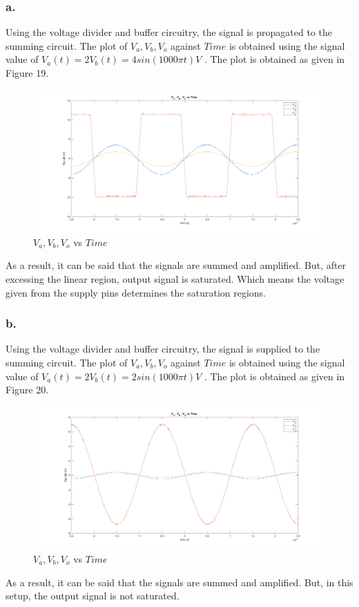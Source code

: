 \documentclass[letterpaper,12pt]{article}
\begin{document}
\subsubsection{a.}
Using the voltage divider and buffer circuitry, the signal is propagated to the summing circuit. The plot of \(V_{a} , V_{b} , V_{o} \) against \( Time\) is obtained using the signal value of \(V_{a}(t) = 2 V_{b}(t) = 4sin(1000\pi t) V\) . The plot is obtained as given in Figure 19.
\begin{figure}[H]
	\centering
   \includegraphics[width=1\textwidth]{e_3_a.png}
   \caption{\(V_{a} , V_{b} , V_{o} \) vs \( Time\)}
\end{figure} 
As a result, it can be said that the signals are summed and amplified. But, after excessing the linear region, output signal is saturated. Which means the voltage given from the supply pins determines the saturation regions.

\subsubsection{b.}
Using the voltage divider and buffer circuitry, the signal is supplied to the summing circuit. The plot of \(V_{a} , V_{b} , V_{o} \) against \( Time\) is obtained using the signal value of \(V_{a}(t) = 2 V_{b}(t) = 2sin(1000\pi t) V\) . The plot is obtained as given in Figure 20.
\begin{figure}[H]
	\centering
   \includegraphics[width=1\textwidth]{e_3_b.png}
   \caption{\(V_{a} , V_{b} , V_{o} \) vs \( Time\)}
\end{figure} 
As a result, it can be said that the signals are summed and amplified. But, in this setup, the output signal is not saturated.
\end{document}
